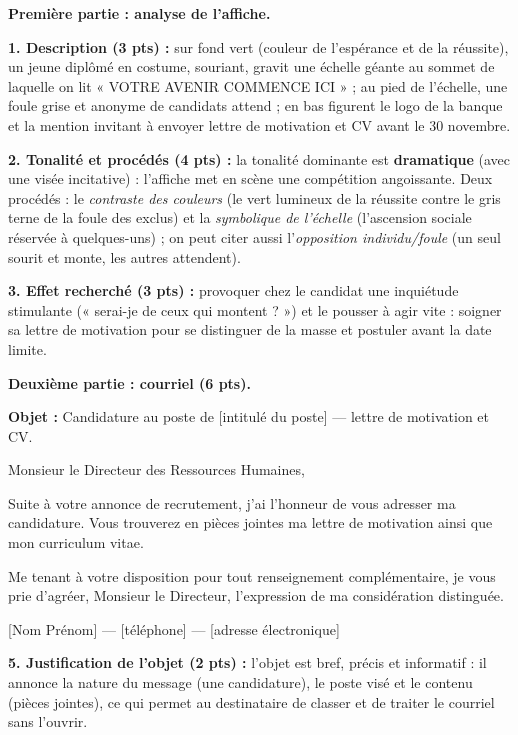 \documentclass[11pt]{article}
\begin{document}
\begin{corrige}
\textbf{Première partie : analyse de l'affiche.}

\textbf{1. Description (3 pts) :} sur fond vert (couleur de l'espérance et de la réussite), un jeune diplômé en costume, souriant, gravit une échelle géante au sommet de laquelle on lit « VOTRE AVENIR COMMENCE ICI » ; au pied de l'échelle, une foule grise et anonyme de candidats attend ; en bas figurent le logo de la banque et la mention invitant à envoyer lettre de motivation et CV avant le 30 novembre.

\textbf{2. Tonalité et procédés (4 pts) :} la tonalité dominante est \textbf{dramatique} (avec une visée incitative) : l'affiche met en scène une compétition angoissante. Deux procédés : le \emph{contraste des couleurs} (le vert lumineux de la réussite contre le gris terne de la foule des exclus) et la \emph{symbolique de l'échelle} (l'ascension sociale réservée à quelques-uns) ; on peut citer aussi l'\emph{opposition individu/foule} (un seul sourit et monte, les autres attendent).

\textbf{3. Effet recherché (3 pts) :} provoquer chez le candidat une inquiétude stimulante (« serai-je de ceux qui montent ? ») et le pousser à agir vite : soigner sa lettre de motivation pour se distinguer de la masse et postuler avant la date limite.

\textbf{Deuxième partie : courriel (6 pts).}

\textbf{Objet :} Candidature au poste de [intitulé du poste] — lettre de motivation et CV.

Monsieur le Directeur des Ressources Humaines,

Suite à votre annonce de recrutement, j'ai l'honneur de vous adresser ma candidature. Vous trouverez en pièces jointes ma lettre de motivation ainsi que mon curriculum vitae.

Me tenant à votre disposition pour tout renseignement complémentaire, je vous prie d'agréer, Monsieur le Directeur, l'expression de ma considération distinguée.

[Nom Prénom] — [téléphone] — [adresse électronique]

\textbf{5. Justification de l'objet (2 pts) :} l'objet est bref, précis et informatif : il annonce la nature du message (une candidature), le poste visé et le contenu (pièces jointes), ce qui permet au destinataire de classer et de traiter le courriel sans l'ouvrir.


\end{corrige}
\end{document}
